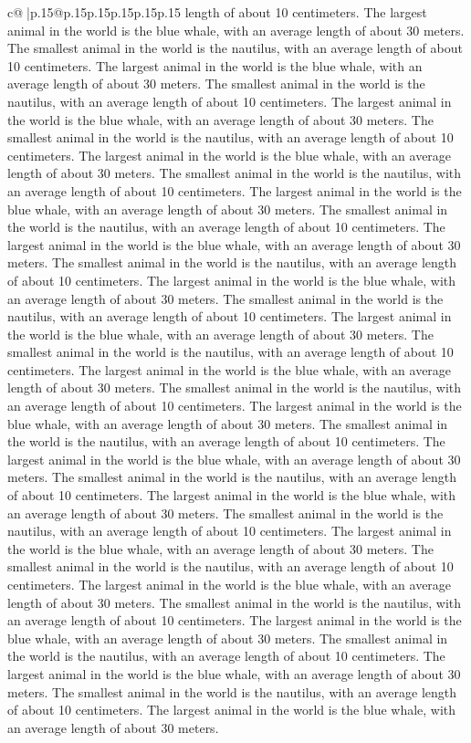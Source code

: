 \documentclass{article}
\begin{document}
{\begin{supertabular}{c@{$\;$}|p{.15\linewidth}@{}p{.15\linewidth}p{.15\linewidth}p{.15\linewidth}p{.15\linewidth}p{.15\linewidth}}
{{{length of about 10 centimeters. The largest animal in the world is the blue whale, with an average length of about 30 meters. The smallest animal in the world is the nautilus, with an average length of about 10 centimeters. The largest animal in the world is the blue whale, with an average length of about 30 meters. The smallest animal in the world is the nautilus, with an average length of about 10 centimeters. The largest animal in the world is the blue whale, with an average length of about 30 meters. The smallest animal in the world is the nautilus, with an average length of about 10 centimeters. The largest animal in the world is the blue whale, with an average length of about 30 meters. The smallest animal in the world is the nautilus, with an average length of about 10 centimeters. The largest animal in the world is the blue whale, with an average length of about 30 meters. The smallest animal in the world is the nautilus, with an average length of about 10 centimeters. The largest animal in the world is the blue whale, with an average length of about 30 meters. The smallest animal in the world is the nautilus, with an average length of about 10 centimeters. The largest animal in the world is the blue whale, with an average length of about 30 meters. The smallest animal in the world is the nautilus, with an average length of about 10 centimeters. The largest animal in the world is the blue whale, with an average length of about 30 meters. The smallest animal in the world is the nautilus, with an average length of about 10 centimeters. The largest animal in the world is the blue whale, with an average length of about 30 meters. The smallest animal in the world is the nautilus, with an average length of about 10 centimeters. The largest animal in the world is the blue whale, with an average length of about 30 meters. The smallest animal in the world is the nautilus, with an average length of about 10 centimeters. The largest animal in the world is the blue whale, with an average length of about 30 meters. The smallest animal in the world is the nautilus, with an average length of about 10 centimeters. The largest animal in the world is the blue whale, with an average length of about 30 meters. The smallest animal in the world is the nautilus, with an average length of about 10 centimeters. The largest animal in the world is the blue whale, with an average length of about 30 meters. The smallest animal in the world is the nautilus, with an average length of about 10 centimeters. The largest animal in the world is the blue whale, with an average length of about 30 meters. The smallest animal in the world is the nautilus, with an average length of about 10 centimeters. The largest animal in the world is the blue whale, with an average length of about 30 meters. The smallest animal in the world is the nautilus, with an average length of about 10 centimeters. The largest animal in the world is the blue whale, with an average length of about 30 meters. The smallest animal in the world is the nautilus, with an average length of about 10 centimeters. The largest animal in the world is the blue whale, with an average length of about 30 meters. }}}
\end{supertabular}}
\end{document}
